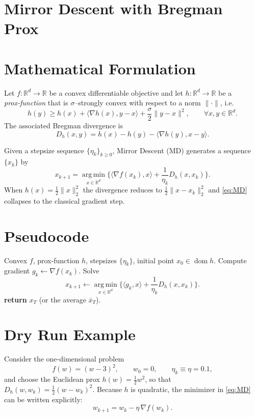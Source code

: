 \documentclass{article}
\newcommand{\inner}[2]{\langle #1,#2\rangle}
\newcommand{\grad}{\nabla}
\newcommand{\Breg}[2]{D_h(#1,#2)}
\newcommand{\R}{\mathbb{R}}
\newcommand{\argmin}{\operatorname*{arg\,min}}
\begin{document}
\section*{Mirror Descent with Bregman Prox}

\section*{Mathematical Formulation}
Let $f:\R^d\rightarrow\R$ be a convex differentiable objective and let $h:\R^d\rightarrow\R$ be a \emph{prox‑function} that is $\sigma$–strongly convex with respect to a norm $\|\cdot\|$, i.e.
\[
h(y)\ge h(x)+\inner{\grad h(x)}{y-x}+\frac{\sigma}{2}\|y-x\|^{2},\qquad\forall x,y\in\R^d .
\]
The associated Bregman divergence is
\[
\Breg{x}{y}=h(x)-h(y)-\inner{\grad h(y)}{x-y}.
\]

Given a stepsize sequence $\{\eta_k\}_{k\ge0}$, Mirror Descent (MD) generates a sequence $\{x_k\}$ by
\begin{equation}\label{eq:MD}
x_{k+1}= \argmin_{x\in\R^d}\Big\{ \inner{\grad f(x_k)}{x}+ \frac{1}{\eta_k}\Breg{x}{x_k}\Big\}.
\end{equation}
When $h(x)=\tfrac12\|x\|_2^{2}$ the divergence reduces to $\tfrac12\|x-x_k\|_2^{2}$ and \eqref{eq:MD} collapses to the classical gradient step.

\section*{Pseudocode}
\begin{algorithm}[H]
\caption{Mirror Descent (MD)}\label{alg:MD}
\begin{algorithmic}[1]
\Require Convex $f$, prox‑function $h$, stepsizes $\{\eta_k\}$, initial point $x_0\in\operatorname{dom}h$.
    \State Compute gradient $g_k\gets\grad f(x_k)$.
    \State Solve
    \[
    x_{k+1}\gets \argmin_{x\in\R^d}\Big\{ \inner{g_k}{x}+ \frac{1}{\eta_k}\Breg{x}{x_k}\Big\}.
    \]
\EndFor
\State \textbf{return} $x_T$ (or the average $\bar x_T$).
\end{algorithmic}
\end{algorithm}

\section*{Dry Run Example}
Consider the one‑dimensional problem
\[
f(w)=(w-3)^{2},\qquad w_0=0,\qquad \eta_k\equiv\eta=0.1,
\]
and choose the Euclidean prox $h(w)=\tfrac12 w^{2}$, so that $\Breg{w}{w_k}= \tfrac12 (w-w_k)^{2}$.
Because $h$ is quadratic, the minimizer in \eqref{eq:MD} can be written explicitly:
\[
w_{k+1}= w_k-\eta\,\grad f(w_k).
\]
\end{document}
